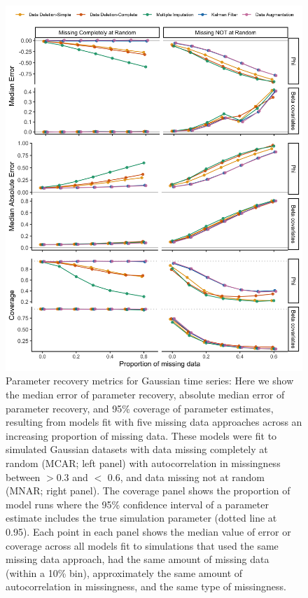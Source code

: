 \documentclass{article}
\begin{document}
\begin{figure}
    \noindent\includegraphics[width = .7\textwidth]{Figures/MockedUpFigures/parameterRecoveryGaussian_MARMNARlong.png}
    \caption{Parameter recovery metrics for Gaussian time series: Here we show the median error of parameter recovery, absolute median error of parameter recovery, and 95\% coverage of parameter estimates, resulting from models fit with five missing data approaches across an increasing proportion of missing data. 
    These models were fit to simulated Gaussian datasets with data missing completely at random (MCAR; left panel) with autocorrelation in missingness between $>$0.3 and $<$ 0.6, and data missing not at random (MNAR; right panel). The coverage panel shows the proportion of model runs where the 95\% confidence interval of a parameter estimate includes the true simulation parameter (dotted line at 0.95). Each point in each panel shows the median value of error or coverage across all models fit to simulations that used the same missing data approach, had the same amount of missing data (within a 10\% bin), approximately the same amount of autocorrelation in missingness, and the same type of missingness.} 
    \label{fig:ParamRec_Gauss}
\end{figure}
\end{document}
